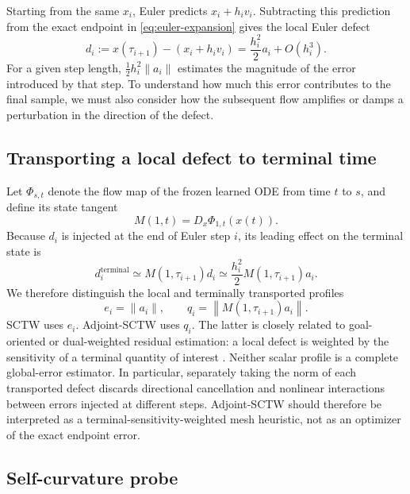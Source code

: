 Starting from the same $x_i$, Euler predicts $x_i+h_i v_i$. Subtracting this prediction
from the exact endpoint in \cref{eq:euler-expansion} gives the local Euler defect
\begin{equation}
  d_i
  :=
  x(\tau_{i+1}) - (x_i+h_i v_i)
  =
  \frac{h_i^2}{2}a_i+O(h_i^3).
  \label{eq:euler-defect}
\end{equation}
For a given step length, $\tfrac12 h_i^2\lVert a_i\rVert$ estimates the magnitude of the
error introduced by that step. To understand how much this error contributes to the final
sample, we must also consider how the subsequent flow amplifies or damps a perturbation
in the direction of the defect.

\subsection{Transporting a local defect to terminal time}
\label{sec:transported-defect}

Let $\Phi_{s,t}$ denote the flow map of the frozen learned ODE from time $t$ to $s$, and define
its state tangent
\begin{equation}
  M(1,t)=D_x\Phi_{1,t}(x(t)).
  \label{eq:flow-tangent}
\end{equation}
Because $d_i$ is injected at the end of Euler step $i$, its leading effect on the terminal state is
\begin{equation}
  d_i^{\mathrm{terminal}}
  \simeq
  M(1,\tau_{i+1})d_i
  \simeq
  \frac{h_i^2}{2}M(1,\tau_{i+1})a_i.
  \label{eq:terminal-defect}
\end{equation}
We therefore distinguish the local and terminally transported profiles
\begin{equation}
  e_i=\lVert a_i\rVert,
  \qquad
  q_i=\left\lVert M(1,\tau_{i+1})a_i\right\rVert.
  \label{eq:transported-profile}
\end{equation}
SCTW uses $e_i$. Adjoint-SCTW uses $q_i$. The latter is closely related to goal-oriented or
dual-weighted residual estimation: a local defect is weighted by the sensitivity of a terminal
quantity of interest \citep{becker2001optimal}.
Neither scalar profile is a complete global-error estimator. In particular, separately taking the
norm of each transported defect discards directional cancellation and nonlinear interactions
between errors injected at different steps. Adjoint-SCTW should therefore be interpreted as a
terminal-sensitivity-weighted mesh heuristic, not as an optimizer of the exact endpoint error.

\subsection{Self-curvature probe}
\label{sec:self-curvature-probe}

